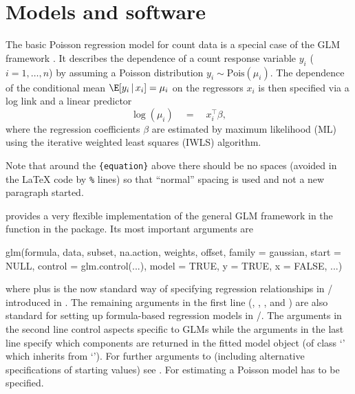 \documentclass[article]{jss}
\newcommand{\class}[1]{`\code{#1}'}
\newcommand{\fct}[1]{\code{#1()}}
\begin{document}
\section{Models and software} \label{sec:models}

The basic Poisson regression model for count data is a special case of the GLM
framework \cite{McCullagh+Nelder:1989}. It describes the dependence of a count
response variable $y_i$ ($i = 1, \dots, n$) by assuming a Poisson distribution
$y_i \sim \mathrm{Pois}(\mu_i)$. The dependence of the conditional mean
$\E[y_i \, | \, x_i] = \mu_i$ on the regressors $x_i$ is then specified via a
log link and a linear predictor
%
\begin{equation} \label{eq:mean}
\log(\mu_i) \quad = \quad x_i^\top \beta,
\end{equation}
%
where the regression coefficients $\beta$ are estimated by maximum likelihood
(ML) using the iterative weighted least squares (IWLS) algorithm.

\begin{leftbar}
Note that around the \verb|{equation}| above there should be no spaces (avoided
in the {\LaTeX} code by \verb|%| lines) so that ``normal'' spacing is used and
not a new paragraph started.
\end{leftbar}

 provides a very flexible implementation of the general GLM
framework in the function \fct{glm} \citep{Chambers+Hastie:1992} in the
 package. Its most important arguments are
\begin{Code}
glm(formula, data, subset, na.action, weights, offset,
  family = gaussian, start = NULL, control = glm.control(...),
  model = TRUE, y = TRUE, x = FALSE, ...)
\end{Code}
where  plus  is the now standard way of specifying
regression relationships in / introduced in
\cite{Chambers+Hastie:1992}. The remaining arguments in the first line
(, , , and ) are also
standard  for setting up formula-based regression models in
/. The arguments in the second line control aspects
specific to GLMs while the arguments in the last line specify which components
are returned in the fitted model object (of class \class{glm} which inherits
from \class{lm}). For further arguments to \fct{glm} (including alternative
specifications of starting values) see . For estimating a Poisson
model  has to be specified.
\end{document}

